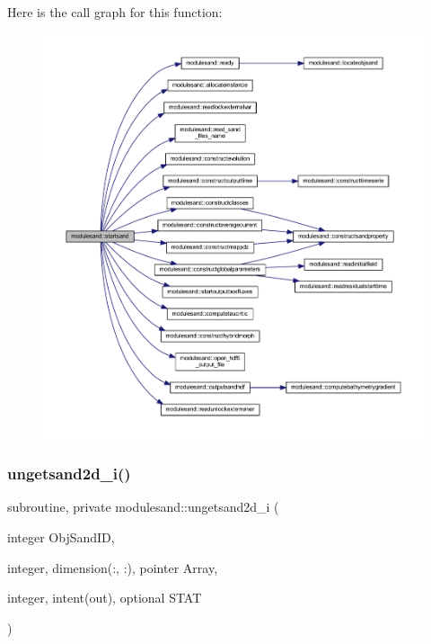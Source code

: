 Here is the call graph for this function\+:\nopagebreak
\begin{figure}[H]
\begin{center}
\leavevmode
\includegraphics[width=350pt]{namespacemodulesand_a40b3b2fd3451026e5dc113c11bf6ad57_cgraph}
\end{center}
\end{figure}
\mbox{\label{namespacemodulesand_a4daaa1c74789b3c8e2b813c33c5dd7f4}} 
\subsubsection{\texorpdfstring{ungetsand2d\+\_\+i()}{ungetsand2d\_i()}}
{\footnotesize\ttfamily subroutine, private modulesand\+::ungetsand2d\+\_\+i (\begin{DoxyParamCaption}\item[{integer}]{Obj\+Sand\+ID,  }\item[{integer, dimension(\+:, \+:), pointer}]{Array,  }\item[{integer, intent(out), optional}]{S\+T\+AT }\end{DoxyParamCaption})\hspace{0.3cm}{\ttfamily [private]}}

